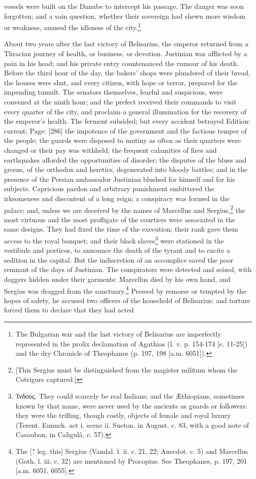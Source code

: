 vessels were built on the Danube to intercept his passage. The danger was soon forgotten; and a vain question, whether their sovereign had shewn more wisdom or weakness, amused the idleness of the city.\footnote{The Bulgarian war and the last victory of Belisarius are imperfectly represented in the prolix declamation of Agathias (l. v. p. 154-174 [c. 11-25]) and the dry Chronicle of Theophanes (p. 197, 198 [a.m. 6051]).}

About two years after the last victory of Belisarius, the emperor returned from a Thracian journey of health, or business, or devotion. Justinian was afflicted by a pain in his head; and his private entry countenanced the rumour of his death. Before the third hour of the day, the bakers\texthebrew{}’ shops were plundered of their bread, the houses were shut, and every citizen, with hope or terror, prepared for the impending tumult. The senators themselves, fearful and suspicious, were convened at the ninth hour; and the prefect received their commands to visit every quarter of the city, and proclaim a general illumination for the recovery of the emperor\texthebrew{}’s health. The ferment subsided; but every accident betrayed Edition: current; Page: [286] the impotence of the government and the factious temper of the people; the guards were disposed to mutiny as often as their quarters were changed or their pay was withheld; the frequent calamities of fires and earthquakes afforded the opportunities of disorder; the disputes of the blues and greens, of the orthodox and heretics, degenerated into bloody battles; and in the presence of the Persian ambassador Justinian blushed for himself and for his subjects. Capricious pardon and arbitrary punishment embittered the irksomeness and discontent of a long reign; a conspiracy was formed in the palace; and, unless we are deceived by the names of Marcellus and Sergius,\footnote{[This Sergius must be distinguished from the magister militum whom the Cotrigurs captured.]} the most virtuous and the most profligate of the courtiers were associated in the same designs. They had fixed the time of the execution; their rank gave them access to the royal banquet; and their black slaves\footnote{\textgreek{\texthebrew{Ἰ}νδούς}. They could scarcely be real Indians; and the Æthiopians, sometimes known by that name, were never used by the ancients as guards or followers: they were the trifling, though costly, objects of female and royal luxury (Terent. Eunuch. act i. scene ii. Sueton. in August. c. 83, with a good note of Casaubon, in Caligulâ, c. 57).} were stationed in the vestibule and porticos, to announce the death of the tyrant and to excite a sedition in the capital. But the indiscretion of an accomplice saved the poor remnant of the days of Justinian. The conspirators were detected and seized, with daggers hidden under their garments: Marcellus died by his own hand, and Sergius was dragged from the sanctuary.\footnote{The [? leg. this] Sergius (Vandal. l. ii. c. 21, 22; Anecdot. c. 5) and Marcellus (Goth. l. iii. c. 32) are mentioned by Procopius. See Theophanes, p. 197, 201 [a.m. 6051, 6055].} Pressed by remorse or tempted by the hopes of safety, he accused two officers of the household of Belisarius; and torture forced them to declare that they had acted 